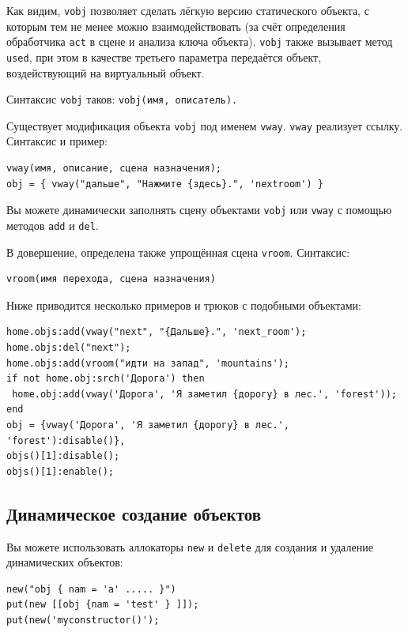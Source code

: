 \documentclass[12pt]{article}
\begin{document}
Как видим, \verb/vobj/ позволяет сделать лёгкую версию статического объекта, с которым тем не менее можно взаимодействовать (за счёт определения обработчика \verb/act/ в сцене и анализа ключа объекта). \verb/vobj/ также вызывает метод \verb/used/, при этом в качестве третьего параметра передаётся объект, воздействующий на виртуальный объект.

Синтаксис \verb/vobj/ таков: \verb/vobj(имя, описатель)./

Существует модификация объекта \verb/vobj/ под именем \verb/vway/. \verb/vway/ реализует ссылку. Синтаксис и пример:

\begin{verbatim}
vway(имя, описание, сцена назначения);
obj = { vway("дальше", "Нажмите {здесь}.", 'nextroom') }
\end{verbatim}

Вы можете динамически заполнять сцену объектами \verb/vobj/ или \verb/vway/ с помощью методов \verb/add/ и \verb/del/.

В довершение, определена также упрощённая сцена \verb/vroom/. Синтаксис:

\begin{verbatim}
vroom(имя перехода, сцена назначения)
\end{verbatim}

Ниже приводится несколько примеров и трюков с подобными объектами:

\begin{verbatim}
home.objs:add(vway("next", "{Дальше}.", 'next_room');
home.objs:del("next");
home.objs:add(vroom("идти на запад", 'mountains');
if not home.obj:srch('Дорога') then
 home.obj:add(vway('Дорога', 'Я заметил {дорогу} в лес.', 'forest'));
end
obj = {vway('Дорога', 'Я заметил {дорогу} в лес.', 'forest'):disable()},
objs()[1]:disable();
objs()[1]:enable();
\end{verbatim}

\subsection{Динамическое создание объектов}
Вы можете использовать аллокаторы \verb/new/ и \verb/delete/ для создания и удаление динамических объектов:

\begin{verbatim}
new("obj { nam = 'a' ..... }")
put(new [[obj {nam = 'test' } ]]);
put(new('myconstructor()');
\end{verbatim}
\end{document}
